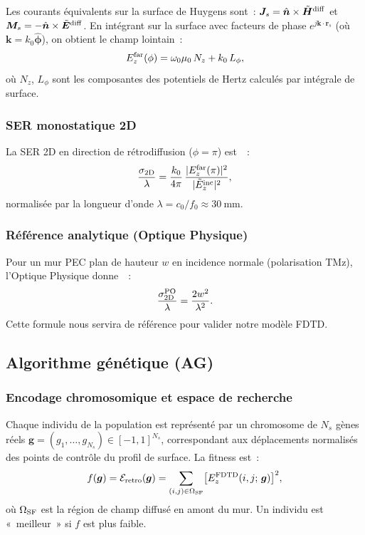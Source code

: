 \documentclass[12pt,a4paper]{article}
\newcommand{\vE}{\bm{E}}
\newcommand{\vH}{\bm{H}}
\newcommand{\vn}{\hat{\bm{n}}}
\newcommand{\muo}{\mu_0}
\begin{document}
Les courants équivalents sur la surface de Huygens sont~:
$\bm{J}_s = \vn \times \tilde{\vH}^{\rm diff}$ et
$\bm{M}_s = -\vn \times \tilde{\vE}^{\rm diff}$.
En intégrant sur la surface avec facteurs de phase $e^{j\bm{k}\cdot\bm{r}_s}$
(où $\bm{k} = k_0\hat{\bm{\phi}}$), on obtient le champ lointain~:
\begin{equation}
    E_z^{\rm far}(\phi) = \omega_0\muo\,N_z + k_0\,L_\phi,
    \label{eq:ntff-ezfar}
\end{equation}
où $N_z$, $L_\phi$ sont les composantes des potentiels de Hertz calculés par
intégrale de surface.

\subsubsection{SER monostatique 2D}

La SER 2D en direction de rétrodiffusion ($\phi = \pi$) est~\cite{Taflove2005}~:
\begin{equation}
    \frac{\sigma_{\rm 2D}}{\lambda} = \frac{k_0}{4\pi}\,
    \frac{|E_z^{\rm far}(\pi)|^2}{|\tilde{E}_z^{\rm inc}|^2},
    \label{eq:rcs-2d}
\end{equation}
normalisée par la longueur d'onde $\lambda = c_0/f_0 \approx \SI{30}{\milli\metre}$.

\subsubsection{Référence analytique (Optique Physique)}

Pour un mur PEC plan de hauteur $w$ en incidence normale (polarisation TMz),
l'Optique Physique donne~\cite{Balanis2012}~:
\begin{equation}
    \frac{\sigma_{\rm 2D}^{\rm PO}}{\lambda} = \frac{2w^2}{\lambda^2}.
    \label{eq:rcs-po}
\end{equation}
Cette formule nous servira de référence pour valider notre modèle FDTD.

\subsection{Algorithme génétique (AG)}
\label{ssec:ga}

\subsubsection{Encodage chromosomique et espace de recherche}

Chaque individu de la population est représenté par un chromosome de $N_s$ gènes
réels $\bm{g} = (g_1, \ldots, g_{N_s}) \in [-1, 1]^{N_s}$, correspondant aux
déplacements normalisés des points de contrôle du profil de surface. La fitness
est~:
\begin{equation}
    f(\bm{g}) = \mathcal{E}_{\rm retro}(\bm{g}) =
    \sum_{(i,j) \in \Omega_{\rm SF}} \bigl[E_z^{\rm FDTD}(i,j;\,\bm{g})\bigr]^2,
    \label{eq:fitness}
\end{equation}
où $\Omega_{\rm SF}$ est la région de champ diffusé en amont du mur.
Un individu est «~meilleur~» si $f$ est plus faible.
\end{document}
